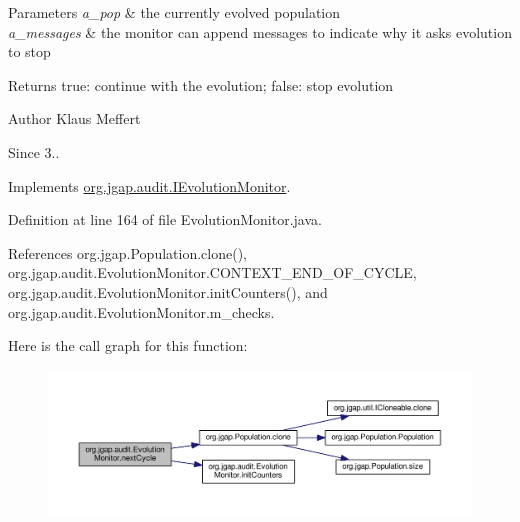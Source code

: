 \begin{DoxyParams}{Parameters}
{\em a\-\_\-pop} & the currently evolved population \\
\hline
{\em a\-\_\-messages} & the monitor can append messages to indicate why it asks evolution to stop \\
\hline
\end{DoxyParams}
\begin{DoxyReturn}{Returns}
true\-: continue with the evolution; false\-: stop evolution
\end{DoxyReturn}
\begin{DoxyAuthor}{Author}
Klaus Meffert 
\end{DoxyAuthor}
\begin{DoxySince}{Since}
3.. 
\end{DoxySince}


Implements \hyperlink{interfaceorg_1_1jgap_1_1audit_1_1_i_evolution_monitor_a564db6ed7124c706e5828c3ef1e1be82}{org.\-jgap.\-audit.\-I\-Evolution\-Monitor}.



Definition at line 164 of file Evolution\-Monitor.\-java.



References org.\-jgap.\-Population.\-clone(), org.\-jgap.\-audit.\-Evolution\-Monitor.\-C\-O\-N\-T\-E\-X\-T\-\_\-\-E\-N\-D\-\_\-\-O\-F\-\_\-\-C\-Y\-C\-L\-E, org.\-jgap.\-audit.\-Evolution\-Monitor.\-init\-Counters(), and org.\-jgap.\-audit.\-Evolution\-Monitor.\-m\-\_\-checks.



Here is the call graph for this function\-:
\nopagebreak
\begin{figure}[H]
\begin{center}
\leavevmode
\includegraphics[width=350pt]{classorg_1_1jgap_1_1audit_1_1_evolution_monitor_a78284026de991d7ee6069a89c5ef00ae_cgraph}
\end{center}
\end{figure}


